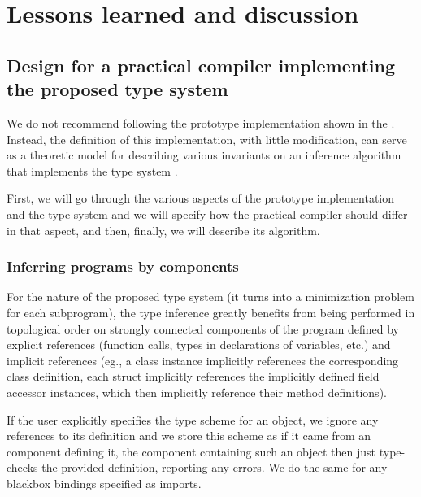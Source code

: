 \chapter{Lessons learned and discussion}

\section{Design for a practical compiler implementing the proposed type system}

We do not recommend following the prototype implementation shown in the . Instead, the definition of this implementation, with little modification, can serve as a theoretic model for describing various invariants on an inference algorithm that implements the type system .

First, we will go through the various aspects of the prototype implementation and the type system and we will specify how the practical compiler should differ in that aspect, and then, finally, we will describe its algorithm.

\subsection{Inferring programs by components}

For the nature of the proposed type system (it turns into a minimization problem for each subprogram), the type inference greatly benefits from being performed in topological order on strongly connected components of the program defined by explicit references (function calls, types in declarations of variables, etc.) and implicit references (eg., a class instance implicitly references the corresponding class definition, each struct implicitly references the implicitly defined field accessor instances, which then implicitly reference their method definitions).

\begin{remark}
    If the user explicitly specifies the type scheme for an object, we ignore any references to its definition and we store this scheme as if it came from an component defining it, the component containing such an object then just type-checks the provided definition, reporting any errors. We do the same for any blackbox bindings specified as imports.
\end{remark}

